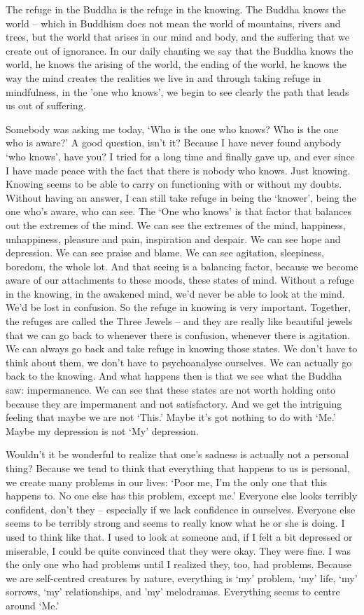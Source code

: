 The refuge in the Buddha is the refuge in the knowing. The Buddha knows the world -- which in Buddhism does not mean the world of mountains, rivers and trees, but the world that arises in our mind and body, and the suffering that we create out of ignorance. In our daily chanting we say that the Buddha knows the world, he knows the arising of the world, the ending of the world, he knows the way the mind creates the realities we live in and through taking refuge in mindfulness, in the 'one who knows', we begin to see clearly the path that leads us out of suffering.

Somebody was asking me today, `Who is the one who knows? Who is the one who is aware?' A good question, isn't it? Because I have never found anybody `who knows', have you? I tried for a long time and finally gave up, and ever since I have made peace with the fact that there is nobody who knows. Just knowing. Knowing seems to be able to carry on functioning with or without my doubts. Without having an answer, I can still take refuge in being the `knower', being the one who's aware, who can see. The `One who knows' is that factor that balances out the extremes of  the mind. We can see the extremes of the mind, happiness, unhappiness, pleasure and pain, inspiration and despair. We can see hope and depression. We can see praise and blame. We can see agitation, sleepiness, boredom, the whole lot. And that seeing is a balancing factor, because we become aware of our attachments to these moods, these states of mind. Without a refuge in the knowing, in the awakened mind, we'd never be able to look at the mind. We'd be lost in confusion. So the refuge in knowing is very important. Together, the refuges are called the Three Jewels -- and they are really like beautiful jewels that we can go back to whenever there is confusion, whenever there is agitation. We can always go back and take refuge in knowing those states. We don't have to think about them, we don't have to psychoanalyse ourselves. We can actually go back to the knowing. And what happens then is that we see what the Buddha saw: impermanence. We can see that these states are not worth holding onto because they are impermanent and not satisfactory. And we get the intriguing feeling that maybe we are not `This.' Maybe it's got nothing to do with `Me.' Maybe my depression is not `My' depression.

Wouldn't it be wonderful to realize that one's sadness is actually not a personal thing? Because we tend to think that everything that happens to us is personal, we create many problems in our lives: `Poor me, I'm the only one that this happens to. No one else has this problem, except me.' Everyone else looks terribly confident, don't they -- especially if we lack confidence in ourselves. Everyone else seems to be terribly strong and seems to really know what he or she is doing. I used to think like that. I used to look at someone and, if I felt a bit depressed or miserable, I could be quite convinced that they were okay. They were fine. I was the only one who had problems until I realized they, too, had problems. Because we are self-centred creatures by nature, everything is `my' problem, `my' life, `my' sorrows, `my' relationships, and 'my' melodramas. Everything seems to centre around `Me.'

